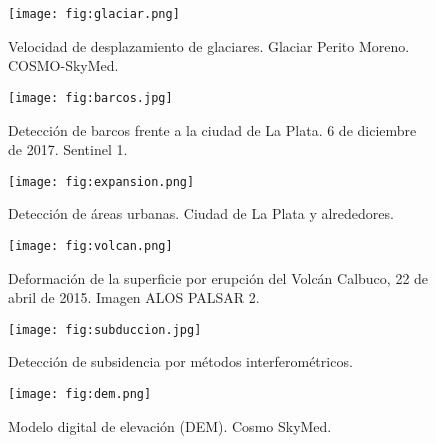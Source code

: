 \begin{frame}{} \vskip0cm
  \begin{figure}
    \centering
    \texttt{[image: fig:glaciar.png]}
    \caption{Velocidad de desplazamiento de glaciares. Glaciar Perito Moreno. COSMO-SkyMed.}
    \label{}
  \end{figure}
\end{frame}

\begin{frame}{} \vskip0cm
  \begin{figure}
    \centering
    \texttt{[image: fig:barcos.jpg]}
    \caption{Detección de barcos frente a la ciudad de La Plata. 6 de diciembre de 2017. Sentinel 1.}
    \label{}
  \end{figure}
\end{frame}

\begin{frame}{} \vskip0cm
  \begin{figure}
    \centering
    \texttt{[image: fig:expansion.png]}
    \caption{Detección de áreas urbanas. Ciudad de La Plata y alrededores.}
    \label{}
  \end{figure}
\end{frame}

\begin{frame}{} \vskip0cm
  \begin{figure}
    \centering
    \texttt{[image: fig:volcan.png]}
    \caption{Deformación de la superficie por erupción del Volcán Calbuco, 22 de abril de 2015. Imagen ALOS PALSAR 2.}
    \label{}
  \end{figure}
\end{frame}

\begin{frame}{} \vskip0cm
  \begin{figure}
    \centering
    \texttt{[image: fig:subduccion.jpg]}
    \caption{Detección de subsidencia por métodos interferométricos.}
    \label{}
  \end{figure}
\end{frame}

\begin{frame}{} \vskip0cm
  \begin{figure}
    \centering
    \texttt{[image: fig:dem.png]}
    \caption{Modelo digital de elevación (DEM). Cosmo SkyMed.}
    \label{}
  \end{figure}
\end{frame}


\gracias
